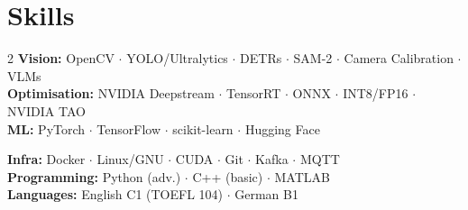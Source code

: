 \documentclass[10pt,a4paper]{article}
\begin{document}
\section{Skills}
\begin{multicols}{2}
\small\noindent
{\color{accent}\bfseries Vision:} OpenCV $\cdot$ YOLO/Ultralytics $\cdot$ DETRs $\cdot$ SAM-2 $\cdot$ Camera Calibration $\cdot$ VLMs\\[1pt]
{\color{accent}\bfseries Optimisation:} NVIDIA Deepstream $\cdot$ TensorRT $\cdot$ ONNX $\cdot$ INT8/FP16 $\cdot$ NVIDIA TAO\\[1pt]
{\color{accent}\bfseries ML:} PyTorch $\cdot$ TensorFlow $\cdot$ scikit-learn $\cdot$ Hugging Face

\columnbreak
{\color{accent}\bfseries Infra:} Docker $\cdot$ Linux/GNU $\cdot$ CUDA $\cdot$ Git $\cdot$ Kafka $\cdot$ MQTT\\[1pt]
{\color{accent}\bfseries Programming:} Python (adv.) $\cdot$ C++ (basic) $\cdot$ MATLAB\\[1pt]
{\color{accent}\bfseries Languages:} English C1 (TOEFL 104) $\cdot$ German B1
\end{multicols}
\end{document}
